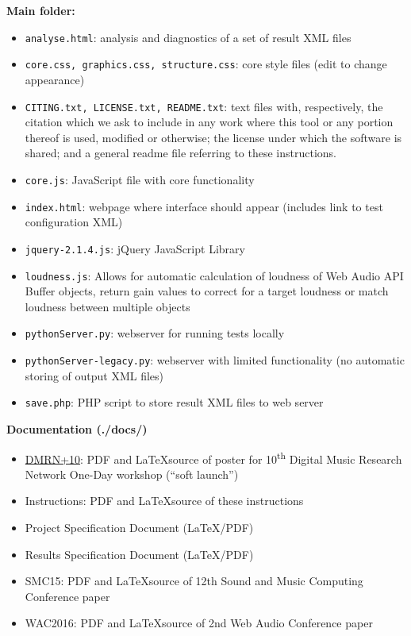 \documentclass[11pt, oneside]{article}   	%
\begin{document}
		\textbf{Main folder:} 
			\begin{itemize}
	            	\item \texttt{analyse.html}: analysis and diagnostics of a set of result XML files
	            	\item \texttt{core.css, graphics.css, structure.css}: core style files (edit to change appearance)
	            	\item \texttt{CITING.txt, LICENSE.txt, README.txt}: text files with, respectively, the citation which we ask to include in any work where this tool or any portion thereof is used, modified or otherwise; the license under which the software is shared; and a general readme file referring to these instructions.
	            	\item \texttt{core.js}: JavaScript file with core functionality
	            	\item \texttt{index.html}: webpage where interface should appear (includes link to test configuration XML)
	            	\item \texttt{jquery-2.1.4.js}: jQuery JavaScript Library
	            	\item \texttt{loudness.js}: Allows for automatic calculation of loudness of Web Audio API Buffer objects, return gain values to correct for a target loudness or match loudness between multiple objects
	            	\item \texttt{pythonServer.py}: webserver for running tests locally
	            	\item \texttt{pythonServer-legacy.py}: webserver with limited functionality (no automatic storing of output XML files)
	            	\item \texttt{save.php}: PHP script to store result XML files to web server\\
			\end{itemize}
	     \textbf{Documentation (./docs/)}
	         \begin{itemize}
	         		\item \href{http://c4dm.eecs.qmul.ac.uk/dmrn/events/dmrnp10/#posters}{DMRN+10}: PDF and \LaTeX source of poster for 10\textsuperscript{th} Digital Music Research Network One-Day workshop (``soft launch'')
	         		\item Instructions: PDF and \LaTeX source of these instructions
	            	\item Project Specification Document (\LaTeX/PDF)
	            	\item Results Specification Document (\LaTeX/PDF)
	            	\item SMC15: PDF and \LaTeX  source of 12th Sound and Music Computing Conference paper \cite{waet}
	            	\item WAC2016: PDF and \LaTeX  source of 2nd Web Audio Conference paper\\
			\end{itemize}
\end{document}
